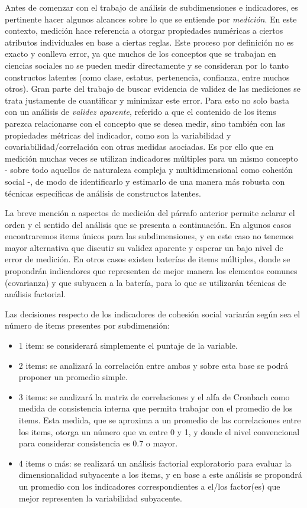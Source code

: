 \documentclass[
  12pt,
]{book}
\begin{document}
Antes de comenzar con el trabajo de análisis de subdimensiones e indicadores, es pertinente hacer algunos alcances sobre lo que se entiende por \emph{medición}. En este contexto, medición hace referencia a otorgar propiedades numéricas a ciertos atributos individuales en base a ciertas reglas. Este proceso por definición no es exacto y conlleva error, ya que muchos de los conceptos que se trabajan en ciencias sociales no se pueden medir directamente y se consideran por lo tanto constructos latentes (como clase, estatus, pertenencia, confianza, entre muchos otros). Gran parte del trabajo de buscar evidencia de validez de las mediciones se trata justamente de cuantificar y minimizar este error. Para esto no solo basta con un análisis de \emph{validez aparente}, referido a que el contenido de los items parezca relacionarse con el concepto que se desea medir, sino también con las propiedades métricas del indicador, como son la variabilidad y covariabilidad/correlación con otras medidas asociadas. Es por ello que en medición muchas veces se utilizan indicadores múltiples para un mismo concepto - sobre todo aquellos de naturaleza compleja y multidimensional como cohesión social -, de modo de identificarlo y estimarlo de una manera más robusta con técnicas específicas de análisis de constructos latentes.

La breve mención a aspectos de medición del párrafo anterior permite aclarar el orden y el sentido del análisis que se presenta a continuación. En algunos casos encontraremos items únicos para las subdimensiones, y en este caso no tenemos mayor alternativa que discutir su validez aparente y esperar un bajo nivel de error de medición. En otros casos existen baterías de items múltiples, donde se propondrán indicadores que representen de mejor manera los elementos comunes (covarianza) y que subyacen a la batería, para lo que se utilizarán técnicas de análisis factorial.

Las decisiones respecto de los indicadores de cohesión social variarán según sea el número de items presentes por subdimensión:

\begin{itemize}
\item
  1 item: se considerará simplemente el puntaje de la variable.
\item
  2 items: se analizará la correlación entre ambas y sobre esta base se podrá proponer un promedio simple.
\item
  3 items: se analizará la matriz de correlaciones y el alfa de Cronbach como medida de consistencia interna que permita trabajar con el promedio de los items. Esta medida, que se aproxima a un promedio de las correlaciones entre los items, otorga un número que va entre 0 y 1, y donde el nivel convencional para considerar consistencia es 0.7 o mayor.
\item
  4 items o más: se realizará un análisis factorial exploratorio para evaluar la dimensionalidad subyacente a los items, y en base a este análisis se propondrá un promedio con los indicadores correspondientes a el/los factor(es) que mejor representen la variabilidad subyacente.
\end{itemize}
\end{document}

